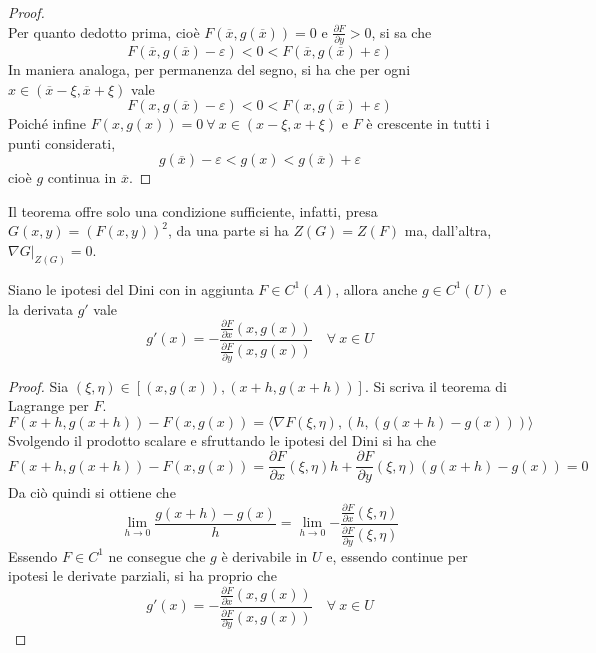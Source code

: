\begin{proof}
\begin{equation}
       \end{equation}
       Per quanto dedotto prima, cioè $F(\overline{x}, g(\overline{x}))=0$ e $\frac{\partial{F}}{\partial{y}}>0$, si sa che 
       \begin{equation}
           F(\overline{x}, g(\overline{x})-\varepsilon)<0<F(\overline{x}, g(\overline{x})+\varepsilon)
       \end{equation}
       In maniera analoga, per permanenza del segno, si ha che per ogni $x \in (\overline{x}-\xi, \overline{x}+\xi)$ vale
       \begin{equation}
           F(x, g(\overline{x})-\varepsilon)<0<F(x, g(\overline{x})+\varepsilon)
       \end{equation}
       Poiché infine $F(x, g(x))=0\ \forall\ x \in (x-\xi, x+\xi)$ e $F$ è crescente in tutti i punti considerati,
       \begin{equation}
           g(\overline{x})- \varepsilon < g(x) < g(\overline{x})+\varepsilon
       \end{equation}
       cioè $g$ continua in $\overline{x}$.
       \end{proof}
\begin{oss}
    Il teorema offre solo una condizione sufficiente, infatti, presa $G(x,y)=(F(x,y))^2$, da una parte si ha $Z(G)=Z(F)$ ma, dall'altra, $\nabla G \big|_{Z(G)}=0$.
\end{oss}
\begin{theorem}
Siano le ipotesi del Dini con in aggiunta $F \in C^1(A)$, allora anche $g \in C^1(U)$ e la derivata $g'$ vale
\begin{equation}
    g'(x)=-\frac{\frac{\partial{F}}{\partial{x}}(x, g(x))}{\frac{\partial{F}}{\partial{y}}(x, g(x))} \quad \forall\ x \in U
\end{equation}
\end{theorem}
\begin{proof}
Sia $(\xi, \eta) \in \left[(x, g(x)), (x+h, g(x+h)) \right]$.
Si scriva il teorema di Lagrange per $F$.
\begin{equation}
    F(x+h, g(x+h))-F(x, g(x)) =\langle \nabla F (\xi, \eta), (h, (g(x+h)-g(x))) \rangle
\end{equation}
Svolgendo il prodotto scalare e sfruttando le ipotesi del Dini si ha che
\begin{equation}
    F(x+h, g(x+h))-F(x, g(x))= \frac{\partial {F}}{\partial{x}}(\xi, \eta) h + \frac{\partial {F}}{\partial{y}}(\xi, \eta) (g(x+h)-g(x))=0
\end{equation}
    Da ciò quindi si ottiene che
    \begin{equation}
        \lim_{h \to 0}{\frac{g(x+h)-g(x)}{h}}=\lim_{h \to 0}{-\frac{\frac{\partial {F}}{\partial{x}}(\xi, \eta)}{\frac{\partial {F}}{\partial{y}}(\xi, \eta)}}
    \end{equation}
Essendo $F \in C^1$ ne consegue che $g$ è derivabile in $U$ e, essendo continue per ipotesi le derivate parziali, si ha proprio che
\begin{equation}
    g'(x)=-\frac{\frac{\partial{F}}{\partial{x}}(x, g(x))}{\frac{\partial{F}}{\partial{y}}(x, g(x))} \quad \forall\ x \in U
\end{equation}
\end{proof}
